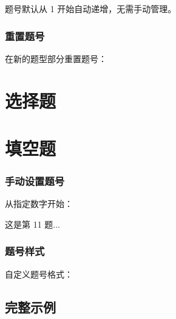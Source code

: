 题号默认从 1 开始自动递增，无需手动管理。

\subsubsection{重置题号}

在新的题型部分重置题号：

\begin{latexcode}
  \section{选择题}
  \begin{question}
  \end{question}

  \section{填空题}
  \begin{question}
  \end{question}
\end{latexcode}

\subsubsection{手动设置题号}

从指定数字开始：

\begin{latexcode}

  \begin{question}
    这是第 11 题...
  \end{question}
\end{latexcode}

\subsubsection{题号样式}

自定义题号格式：

\begin{latexcode}
\end{latexcode}


\subsection{完整示例}

